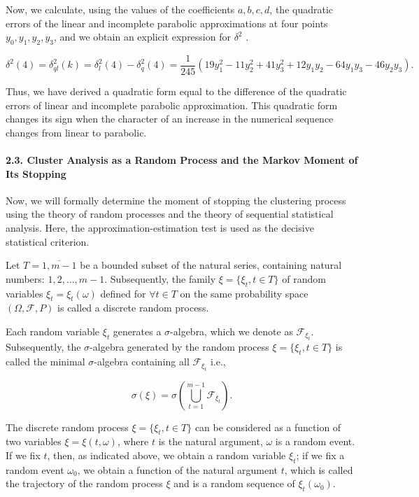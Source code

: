 Now, we calculate, using the values of the coefficients \(a, b, c, d\), the quadratic errors of the linear and incomplete parabolic approximations at four points \(y_0, y_1, y_2, y_3\), and we obtain an explicit expression for \(\delta^2\)  \cite{Orekhov201809,Orekhov2018}.

\begin{equation}
	\label{eqn:47}
	\delta^2(4) = \delta_{ql}^2(k) = \delta_l^2(4) - \delta_q^2(4) = \frac{1}{245}(19y_1^2 - 11y_2^2 + 41y_3^2 + 12y_1y_2 - 64 y_1y_3 - 46y_2y_3).
\end{equation}

Thus, we have derived a quadratic form equal to the difference of the quadratic errors of linear and incomplete parabolic approximation. This quadratic form changes its sign when the character of an increase in the numerical sequence changes from linear to parabolic.

\paragraph{2.3. Cluster Analysis as a Random Process and the Markov Moment of Its Stopping}

Now, we will formally determine the moment of stopping the clustering process using the theory of random processes and the theory of sequential statistical analysis. Here, the approximation-estimation test is used as the decisive statistical criterion.

Let \(T = \overline{1, m - 1}\) be a bounded subset of the natural series, containing natural numbers: \(1, 2, \ldots, m - 1\). Subsequently, the family \(\xi = \{\xi_t, t \in T\}\) of random variables \(\xi_t = \xi_t(\omega)\) defined for \(\forall t \in T\) on the same probability space \((\Omega, \mathcal{F}, P)\) is called a discrete random process.

Each random variable \(\xi_t\) generates a \(\sigma\)-algebra, which we denote as \(\mathcal{F}_{\xi_t}\). Subsequently, the \(\sigma\)-algebra generated by the random process \(\xi = \{\xi_t,t \in T\}\) is called the minimal \(\sigma\)-algebra containing all \(\mathcal{F}_{\xi_t}\) i.e.,

\begin{equation}
	\label{eqn:48}
	\sigma(\xi) = \sigma(\bigcup_{t=1}^{m-1} \mathcal{F}_{\xi_t}).
\end{equation}

The discrete random process \(\xi = \{\xi_t, t \in T\}\) can be considered as a function of two variables \(\xi = \xi(t, \omega)\), where \(t\) is the natural argument, \(\omega\) is a random event. If we fix \(t\), then, as indicated above, we obtain a random variable \(\xi_t\); if we fix a random event \(\omega_0\), we obtain a function of the natural argument \(t\), which is called the trajectory of the random process \(\xi\) and is a random sequence of \(\xi_t(\omega_0)\).

